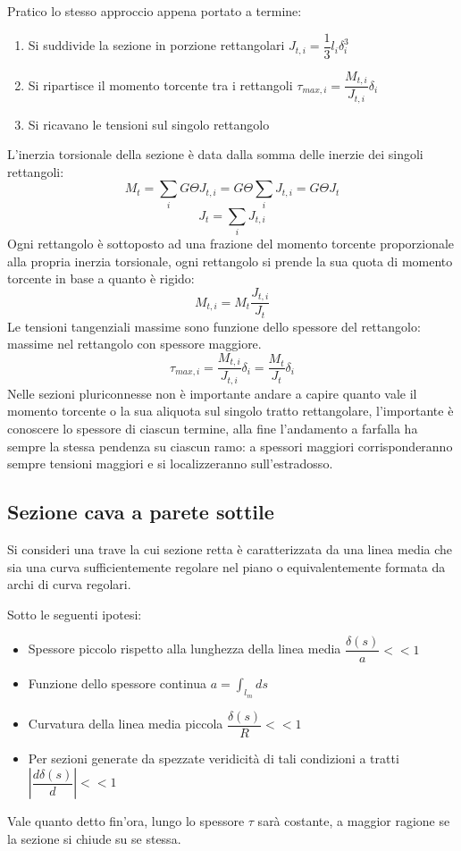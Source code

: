 		Pratico lo stesso approccio appena portato a termine:
		\begin{enumerate}
			\item Si suddivide la sezione in porzione rettangolari \( J_{t,i} = \dfrac{1}{3}l_i\delta^3_i \)
			\item Si ripartisce il momento torcente tra i rettangoli \( \tau_{max,i} = \dfrac{M_{t,i}}{J_{t,i}}\delta_i\)
			\item Si ricavano le tensioni sul singolo rettangolo
		\end{enumerate}
		L’inerzia torsionale della sezione è data dalla somma delle inerzie dei
		singoli rettangoli:
		\[ M_t = \sum_i G\Theta J_{t,i} = G\Theta \sum_i J_{t,i} = G\Theta J_t\]
		\[ J_t = \sum_i J_{t,i} \]
		Ogni rettangolo è sottoposto ad una frazione del momento torcente
		proporzionale alla propria inerzia torsionale, ogni rettangolo si prende la sua quota di momento torcente in base a quanto è rigido:
		\[ M_{t,i} = M_t\dfrac{J_{t,i}}{J_{t}} \]
		Le tensioni tangenziali massime sono funzione dello spessore del
		rettangolo: massime nel rettangolo con spessore maggiore.
		\[ \tau_{max,i} = \dfrac{M_{t,i}}{J_{t,i}}\delta_i = \dfrac{M_t}{J_t}\delta_i \]
		Nelle sezioni pluriconnesse non è importante andare a capire quanto vale il momento torcente o la sua aliquota sul singolo tratto rettangolare, l'importante è conoscere lo spessore di ciascun termine, alla fine l'andamento a farfalla ha sempre la stessa pendenza su ciascun ramo: a spessori maggiori corrisponderanno sempre tensioni maggiori e si localizzeranno sull'estradosso. 	 
			
\subsection{Sezione cava a parete sottile}
		Si consideri una trave la cui sezione retta è caratterizzata da una linea media che sia una curva sufficientemente
		regolare nel piano o equivalentemente formata da archi di curva regolari. 
		
		Sotto le seguenti ipotesi:
		\begin{itemize}
			\item Spessore piccolo rispetto alla lunghezza della linea media \(\dfrac{\delta(s)}{a}<<1\)
			\item Funzione dello spessore continua \( a = \int_{l_m}ds\)
			\item Curvatura della linea media  piccola \(\dfrac{\delta(s)}{R}<<1\)
			\item Per sezioni generate da spezzate veridicità di tali condizioni a tratti  \( \left|\dfrac{d\delta(s)}{d}\right|<<1 \)
		\end{itemize}
		Vale quanto detto fin'ora, lungo lo spessore $\tau$ sarà costante, a maggior ragione se la sezione si chiude su se stessa.
		
